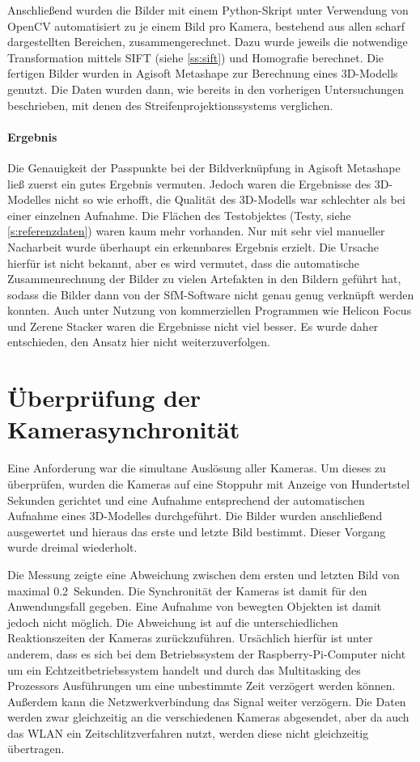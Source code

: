 \documentclass[./00PhotoBox.tex]{subfiles}
\begin{document}
Anschließend wurden die Bilder mit einem Python-Skript unter Verwendung von OpenCV automatisiert zu je einem Bild pro Kamera, bestehend aus allen scharf dargestellten Bereichen, zusammengerechnet. Dazu wurde jeweils die notwendige Transformation mittels \Gls{SIFT} (siehe \autoref{ss:sift}) und \Gls{Homografie} berechnet. Die fertigen Bilder wurden in Agisoft Metashape zur Berechnung eines 3D-Modells genutzt. Die Daten wurden dann, wie bereits in den vorherigen Untersuchungen beschrieben, mit denen des Streifenprojektionssystems verglichen.

\paragraph{Ergebnis}
Die Genauigkeit der Passpunkte bei der Bildverknüpfung in Agisoft Metashape ließ zuerst ein gutes Ergebnis vermuten. Jedoch waren die Ergebnisse des 3D-Modelles nicht so wie erhofft, die Qualität des 3D-Modells war schlechter als bei einer einzelnen Aufnahme. Die Flächen des Testobjektes (Testy, siehe \autoref{s:referenzdaten}) waren kaum mehr vorhanden. Nur mit sehr viel manueller Nacharbeit wurde überhaupt ein erkennbares Ergebnis erzielt. Die Ursache hierfür ist nicht bekannt, aber es wird vermutet, dass die au\-to\-ma\-tische Zusammenrechnung der Bilder zu vielen Artefakten in den Bildern geführt hat, sodass die Bilder dann von der \Gls{SfM}-Software nicht genau genug verknüpft werden konnten. Auch unter Nutzung von kommerziellen Programmen wie Helicon Focus \citep[verwendet von]{focusstack_sfm} und Zerene Stacker waren die Ergebnisse nicht viel besser. Es wurde daher entschieden, den Ansatz hier nicht weiterzuverfolgen.

\section{Überprüfung der Kamerasynchronität}
\label{s:kamerasynchronitaet}
Eine Anforderung war die simultane Auslösung aller Kameras. Um dieses zu überprüfen, wurden die Kameras auf eine Stoppuhr mit Anzeige von Hundertstel Sekunden gerichtet und eine Aufnahme entsprechend der au\-to\-ma\-tischen Aufnahme eines 3D-Modelles durchgeführt. Die Bilder wurden anschließend ausgewertet und hieraus das erste und letzte Bild bestimmt. Dieser Vorgang wurde dreimal wiederholt.

Die Messung zeigte eine Abweichung zwischen dem ersten und letzten Bild von maximal \SI{0,2}{Sekunden}. Die Synchronität der Kameras ist damit für den Anwendungsfall gegeben. Eine Aufnahme von bewegten Objekten ist damit jedoch nicht möglich. Die Abweichung ist auf die unterschiedlichen Reaktionszeiten der Kameras zurückzuführen. Ursächlich hierfür ist unter anderem, dass es sich bei dem Betriebssystem der Raspberry-Pi-Computer nicht um ein Echtzeitbetriebssystem handelt und durch das Multitasking des Prozessors Ausführungen um eine unbestimmte Zeit verzögert werden können. Außerdem kann die Netzwerkverbindung das Signal weiter verzögern. Die Daten werden zwar gleichzeitig an die verschiedenen Kameras abgesendet, aber da auch das WLAN ein Zeitschlitzverfahren nutzt, werden diese nicht gleichzeitig übertragen.

\biblio
\end{document}
